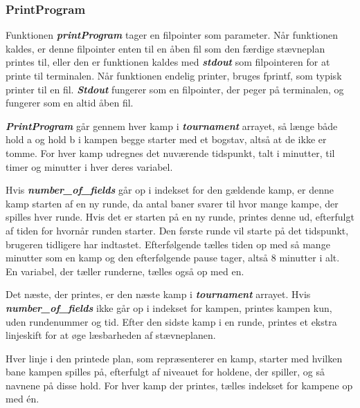 \subsubsection{PrintProgram}
Funktionen \textbf{\textit{printProgram}} tager en filpointer som parameter. Når funktionen kaldes, er denne filpointer enten til en åben fil som den færdige stævneplan printes til, eller den er funktionen kaldes med \textbf{\textit{stdout}} som filpointeren for at printe til terminalen. Når funktionen endelig printer, bruges fprintf, som typisk printer til en fil. \textbf{\textit{Stdout}} fungerer som en filpointer, der peger på terminalen, og fungerer som en altid åben fil. 
\par
\textbf{\textit{PrintProgram}} går gennem hver kamp i \textbf{\textit{tournament}} arrayet, så længe både hold a og hold b i kampen begge starter med et bogstav, altså at de ikke er tomme. For hver kamp udregnes det nuværende tidspunkt, talt i minutter, til timer og minutter i hver deres variabel.
\par
Hvis \textbf{\textit{number\_of\_fields}} går op i indekset for den gældende kamp, er denne kamp starten af en ny runde, da antal baner svarer til hvor mange kampe, der spilles hver runde. Hvis det er starten på en ny runde, printes denne ud, efterfulgt af tiden for hvornår runden starter. Den første runde vil starte på det tidspunkt, brugeren tidligere har indtastet. Efterfølgende tælles tiden op med så mange minutter som en kamp og den efterfølgende pause tager, altså 8 minutter i alt. En variabel, der tæller runderne, tælles også op med en. 
\par
Det næste, der printes, er den næste kamp i \textbf{\textit{tournament}} arrayet. Hvis \textbf{\textit{number\_of\_fields}} ikke går op i indekset for kampen, printes kampen kun, uden rundenummer og tid. Efter den sidste kamp i en runde, printes et ekstra linjeskift for at øge læsbarheden af stævneplanen. 
\par
Hver linje i den printede plan, som repræsenterer en kamp, starter med hvilken bane kampen spilles på, efterfulgt af niveauet for holdene, der spiller, og så navnene på disse hold. For hver kamp der printes, tælles indekset for kampene op med én. \\

